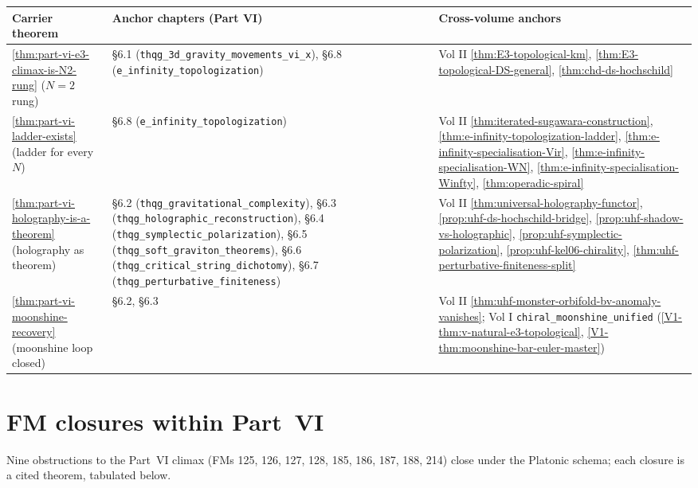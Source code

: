 \begin{center}
\begin{tabular}{p{3.5cm}|p{6cm}|p{5cm}}
\hline
\textbf{Carrier theorem} & \textbf{Anchor chapters (Part VI)} &
\textbf{Cross-volume anchors} \\
\hline
\ref{thm:part-vi-e3-climax-is-N2-rung} ($N=2$ rung)
 & \S6.1 (\texttt{thqg\_3d\_gravity\_movements\_vi\_x}),
 \S6.8 (\texttt{e\_infinity\_topologization})
 & Vol II \ref{thm:E3-topological-km},
 \ref{thm:E3-topological-DS-general},
 \ref{thm:chd-ds-hochschild} \\
\hline
\ref{thm:part-vi-ladder-exists} (ladder for every $N$)
 & \S6.8 (\texttt{e\_infinity\_topologization})
 & Vol II \ref{thm:iterated-sugawara-construction},
 \ref{thm:e-infinity-topologization-ladder},
 \ref{thm:e-infinity-specialisation-Vir},
 \ref{thm:e-infinity-specialisation-WN},
 \ref{thm:e-infinity-specialisation-Winfty},
 \ref{thm:operadic-spiral} \\
\hline
\ref{thm:part-vi-holography-is-a-theorem} (holography as theorem)
 & \S6.2 (\texttt{thqg\_gravitational\_complexity}),
 \S6.3 (\texttt{thqg\_holographic\_reconstruction}),
 \S6.4 (\texttt{thqg\_symplectic\_polarization}),
 \S6.5 (\texttt{thqg\_soft\_graviton\_theorems}),
 \S6.6 (\texttt{thqg\_critical\_string\_dichotomy}),
 \S6.7 (\texttt{thqg\_perturbative\_finiteness})
 & Vol II \ref{thm:universal-holography-functor},
 \ref{prop:uhf-ds-hochschild-bridge},
 \ref{prop:uhf-shadow-vs-holographic},
 \ref{prop:uhf-symplectic-polarization},
 \ref{prop:uhf-kel06-chirality},
 \ref{thm:uhf-perturbative-finiteness-split} \\
\hline
\ref{thm:part-vi-moonshine-recovery} (moonshine loop closed)
 & \S6.2, \S6.3
 & Vol II \ref{thm:uhf-monster-orbifold-bv-anomaly-vanishes};
 Vol I \texttt{chiral\_moonshine\_unified}
 (\ref{V1-thm:v-natural-e3-topological},
 \ref{V1-thm:moonshine-bar-euler-master}) \\
\hline
\end{tabular}
\end{center}

\section{FM closures within Part~VI}
\label{sec:part-vi-fm-closures}

Nine obstructions to the Part~VI climax (FMs 125, 126, 127,
128, 185, 186, 187, 188, 214) close under the Platonic schema; each
closure is a cited theorem, tabulated below.

